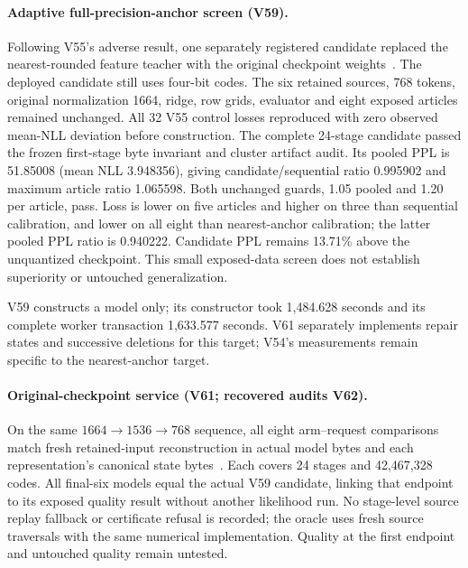 \documentclass[10pt,twocolumn,letterpaper]{article}
\begin{document}
\paragraph{Adaptive full-precision-anchor screen (V59).}
Following V55's adverse result, one separately registered candidate replaced the
nearest-rounded feature teacher with the original checkpoint weights~\cite{v59terminal}.
The deployed candidate still uses four-bit codes. The six retained sources,
768 tokens, original normalization 1664, ridge, row grids, evaluator and eight
exposed articles remained unchanged. All 32 V55 control losses reproduced with
zero observed mean-NLL deviation before construction. The complete 24-stage
candidate passed the frozen first-stage byte invariant and cluster artifact audit.
Its pooled PPL is 51.85008 (mean NLL 3.948356), giving candidate/sequential ratio
0.995902 and maximum article ratio 1.065598. Both unchanged guards, 1.05 pooled
and 1.20 per article, pass. Loss is lower on five articles and higher on three
than sequential calibration, and lower on all eight than nearest-anchor
calibration; the latter pooled PPL ratio is 0.940222. Candidate PPL remains
13.71\% above the unquantized checkpoint. This small exposed-data screen does
not establish superiority or untouched generalization.

V59 constructs a model only; its constructor took 1,484.628 seconds and its
complete worker transaction 1,633.577 seconds. V61 separately implements repair
states and successive deletions for this target; V54's measurements remain
specific to the nearest-anchor target.

\paragraph{Original-checkpoint service (V61; recovered audits V62).}
On the same $1664\to1536\to768$ sequence, all eight arm--request comparisons
match fresh retained-input reconstruction in actual model bytes and each
representation's canonical state bytes~\cite{v62terminal}. Each covers 24 stages
and 42,467,328 codes. All final-six models equal the actual V59 candidate, linking
that endpoint to its exposed quality result without another likelihood run.
No stage-level source replay fallback or certificate refusal is recorded; the
oracle uses fresh source traversals with the same numerical implementation.
Quality at the first endpoint and untouched quality remain untested.
\end{document}
